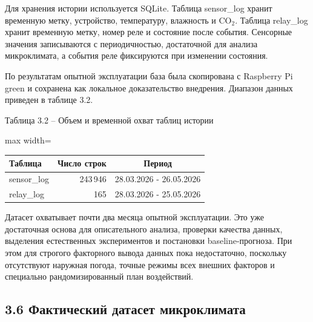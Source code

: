 \documentclass[a4paper,14pt]{extarticle}
\newenvironment{vkrlongtab}[1]
  {\par\setlength{\topsep}{4pt}\setlength{\partopsep}{0pt}%
   \begin{center}\singlespacing\small
   \hyphenpenalty=200\relax\exhyphenpenalty=200\relax\hbadness=10000\relax
   \begin{adjustbox}{max width=\linewidth}\begin{tabular}{#1}}
  {\end{tabular}\end{adjustbox}\end{center}\par}
\renewcommand{\texttt}[1]{\textnormal{#1}}
\begin{document}
Для хранения истории используется SQLite. Таблица \texttt{sensor\_log}
хранит временную метку, устройство, температуру, влажность и CO\(_2\).
Таблица \texttt{relay\_log} хранит временную метку, номер реле и
состояние после события. Сенсорные значения записываются с
периодичностью, достаточной для анализа микроклимата, а события реле
фиксируются при изменении состояния.

По результатам опытной эксплуатации база была скопирована с Raspberry Pi
\texttt{green} и сохранена как локальное доказательство внедрения.
Диапазон данных приведен в таблице 3.2.

\par\vspace{10pt}\noindent\begin{minipage}{\linewidth}
\setlength{\parindent}{1.5cm}Таблица 3.2 -- Объем и временной охват таблиц истории\par\nopagebreak
\begin{vkrlongtab}{@{}lrc@{}}
\toprule
Таблица & Число строк & Период \\
\midrule

\texttt{sensor\_log} & 243\,946 & 28.03.2026 - 26.05.2026 \\
\texttt{relay\_log} & 165 & 28.03.2026 - 25.05.2026 \\
\bottomrule
\end{vkrlongtab}
\end{minipage}\par\vspace{6pt}

Датасет охватывает почти два месяца опытной эксплуатации. Это уже
достаточная основа для описательного анализа, проверки качества данных,
выделения естественных экспериментов и постановки baseline-прогноза. При
этом для строгого факторного вывода данных пока недостаточно, поскольку
отсутствуют наружная погода, точные режимы всех внешних факторов и
специально рандомизированный план воздействий.

\hypertarget{ux444ux430ux43aux442ux438ux447ux435ux441ux43aux438ux439-ux434ux430ux442ux430ux441ux435ux442-ux43cux438ux43aux440ux43eux43aux43bux438ux43cux430ux442ux430}{%
\subsection{3.6 Фактический датасет
микроклимата}\label{ux444ux430ux43aux442ux438ux447ux435ux441ux43aux438ux439-ux434ux430ux442ux430ux441ux435ux442-ux43cux438ux43aux440ux43eux43aux43bux438ux43cux430ux442ux430}}
\end{document}

